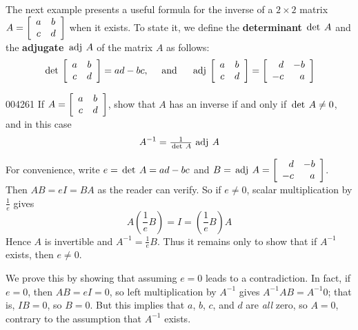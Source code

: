 The next example presents a useful formula for the inverse of a $2 \times 2$ matrix $A = \left[ \begin{array}{cc}
a & b \\
c & d
\end{array} \right]$ when it exists. To state it, we define the \textbf{determinant} $\thinspace\operatorname{det \medspace}A$ and the \textbf{adjugate} $\thinspace\operatorname{adj \medspace}A$ of the matrix $A$ as follows:
\begin{equation*}
\thinspace\operatorname{det\medspace}\left[ \begin{array}{cc}
a & b \\
c & d
\end{array} \right] = ad - bc, \quad \mbox{ and } \quad \thinspace\operatorname{adj\medspace} \left[ \begin{array}{cc}
a & b \\
c & d
\end{array} \right] = \left[ \begin{array}{rr}
d & -b \\
-c & a
\end{array} \right]
\end{equation*}
\begin{example}{}{004261}
If $A = \left[ \begin{array}{cc}
a & b \\
c & d
\end{array} \right]$, show that $A$ has an inverse if and only if $\thinspace\operatorname{det \medspace} A \neq 0$, and in this case
\begin{equation*}
A^{-1} = \tfrac{1}{\thinspace\operatorname{det \medspace} A} \thinspace\operatorname{adj \medspace} A
\end{equation*}
\begin{solution}
  For convenience, write $e = \thinspace\operatorname{det \medspace} A = ad - bc$ and 
  $B = \thinspace\operatorname{adj \medspace} A = \left[ \begin{array}{rr}
  d & -b \\
  -c & a
  \end{array} \right]$. Then $AB = eI = BA$ as the reader can verify. So if $e \neq 0$, scalar multiplication by $\frac{1}{e}$ gives 
\begin{equation*}
A(\frac{1}{e}B) = I = (\frac{1}{e}B)A
\end{equation*}
Hence $A$ is invertible and $A^{-1} = \frac{1}{e}B$. Thus it remains only to show that if $A^{-1}$ exists, then $e \neq 0$.

We prove this by showing that assuming $e = 0$ leads to a contradiction. In fact, if $e = 0$, then $AB = eI = 0$, so left multiplication by $A^{-1}$ gives $A^{-1}AB = A^{-1}0$; that is, $IB = 0$, so $B = 0$. But this implies that $a$, $b$, $c$, and $d$ are \textit{all} zero, so $A = 0$, contrary to the assumption that $A^{-1}$ exists.
\end{solution}
\end{example}

